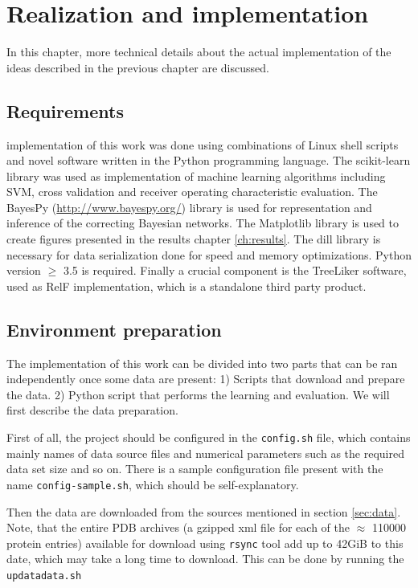 \documentclass[11pt,twoside,a4paper]{book}
\begin{document}
\chapter{Realization and implementation}
\label{ch:realization}
In this chapter, more technical details about the actual implementation 
of the ideas described in the previous chapter are discussed.

\section{Requirements} implementation of this work was done using combinations of Linux shell scripts
and novel software written in the Python programming language.
The scikit-learn \cite{sklearn} library was used as 
implementation of machine learning algorithms including SVM, cross validation and receiver operating characteristic evaluation.
The BayesPy (\url{http://www.bayespy.org/}) library is used for representation and inference of 
the correcting Bayesian networks.
The Matplotlib library is used to create figures presented in the results chapter \ref{ch:results}.
The dill library is necessary for data serialization done for speed and memory optimizations.
Python version $\ge$ 3.5 is required.
Finally a crucial component is the TreeLiker software,
used as RelF implementation,
which is a standalone third party product.


\section{Environment preparation} The implementation of this work can be divided into two parts that can be ran independently once some data are present:
1) Scripts that download and prepare the data.
2) Python script that performs the learning and evaluation.
We will first describe the data preparation.

First of all, the project should be configured in the \texttt{config.sh} file,
which contains mainly names of data source files and numerical parameters
such as the required data set size and so on.
There is a sample configuration file present with the name \texttt{config-sample.sh},
which should be self-explanatory.

Then the data are downloaded from the sources mentioned in section \ref{sec:data}.
Note, that the entire PDB archives (a gzipped xml file for each of the $\approx$ 110000 protein entries)
available for download using \texttt{rsync} tool add up to 42GiB to this date,
which may take a long time to download.
This can be done by running the \texttt{updatadata.sh}
\end{document}
